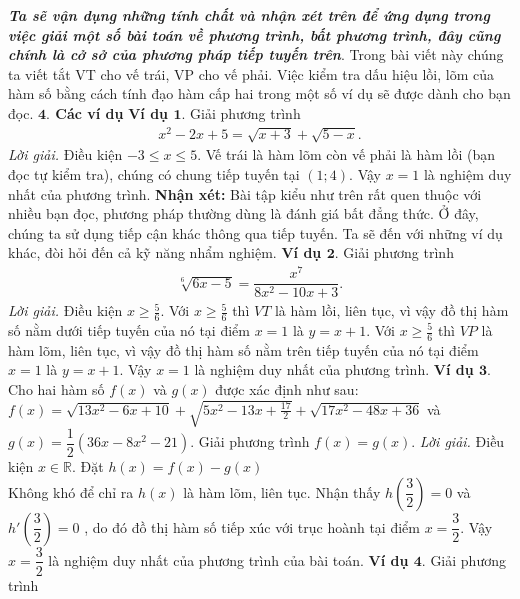 \begin{multicols}{2}
	\vskip 0.1cm
	\textit{\textbf{\color{hoccungpi}Ta sẽ vận dụng những tính chất và nhận xét trên để ứng dụng trong việc giải một số bài toán về phương trình, bất phương trình, đây cũng chính là cở sở của phương pháp tiếp tuyến trên}}.
	\vskip 0.1cm
	Trong bài viết này chúng ta viết tắt VT cho vế trái, VP cho vế phải.
	Việc kiểm tra dấu hiệu lồi, lõm của hàm số bằng cách tính đạo hàm cấp hai trong một số ví dụ sẽ được dành cho bạn đọc.
	\vskip 0.1cm
	\textbf{\color{hoccungpi}$\pmb{4.}$ Các ví dụ}
	\vskip 0.1cm
	\textbf{\color{hoccungpi}Ví dụ $\pmb{1.}$} Giải phương trình
	\begin{align*}
		x^2-2x+5=\sqrt{x+3}+\sqrt{5-x}.
	\end{align*}
	\textit{Lời giải.} Điều kiện $-3\leq x\leq 5$. Vế trái là hàm lõm còn vế phải là hàm lồi (bạn đọc tự kiểm tra), chúng có chung tiếp tuyến tại $(1;4)$. Vậy $x=1$ là nghiệm duy nhất của phương trình.
	\vskip 0.1cm
	\textbf{\color{hoccungpi}Nhận xét:} Bài tập kiểu như trên rất quen thuộc với nhiều bạn đọc, phương pháp thường dùng là đánh giá bất đẳng thức. Ở đây, chúng ta sử dụng tiếp cận khác thông qua tiếp tuyến.
	\vskip 0.1cm
	Ta sẽ đến với những ví dụ khác, đòi hỏi đến cả kỹ năng nhẩm nghiệm.
	\vskip 0.1cm
	\textbf{\color{hoccungpi}Ví dụ $\pmb{2.}$} Giải phương trình
	\begin{align*}
		\sqrt[6]{6x-5}=\dfrac{x^{7}}{8x^{2}-10x+3}.
	\end{align*}
	\textit{Lời giải.} Điều kiện $x\ge \frac{5}{6}$. Với $x\ge \frac{5}{6}$ thì $VT$ là hàm lồi, liên tục, vì vậy đồ thị hàm số nằm dưới tiếp tuyến của nó tại điểm $x=1$ là $y=x+1$.
	Với $x\ge\frac{5}{6}$ thì $VP$ là hàm lõm, liên tục, vì vậy đồ thị hàm số nằm trên tiếp tuyến của nó tại điểm $x=1$ là $y=x+1$.
	\vskip 0.1cm
	Vậy $x=1$ là nghiệm duy nhất của phương trình. 
	\vskip 0.1cm
	\textbf{\color{hoccungpi}Ví dụ $\pmb{3.}$} Cho hai hàm số $f(x)$ và $g(x)$ được xác định như sau: $f(x)=\sqrt{13x^{2} - 6x + 10 } + \sqrt{5x^{2} -13x + \frac{17}{2}} + \sqrt{17x^{2} - 48x + 36} $ và $g(x)= \dfrac{1}{2}(36x - 8x^{2} - 21)$.
	\vskip 0.1cm
	Giải phương trình $f(x)=g(x)$.
	\vskip 0.1cm
	\textit{Lời giải.} Điều kiện $x\in \mathbb R$. Đặt $h(x)=f(x)-g(x)$\\ Không khó để chỉ ra $h(x)$ là hàm lõm, liên tục. Nhận thấy $h(\dfrac{3}{2})=0$ và $h'(\dfrac 32)=0$ , do đó đồ thị hàm số tiếp xúc với trục hoành tại điểm $x=\dfrac{3}{2}$.
	\vskip 0.1cm
	Vậy $x=\dfrac{3}{2}$ là nghiệm duy nhất của phương trình của bài toán.
	\vskip 0.1cm
	\textbf{\color{hoccungpi}Ví dụ $\pmb{4.}$} Giải phương trình
	\begin{align*}

\end{align*}
\end{multicols}
